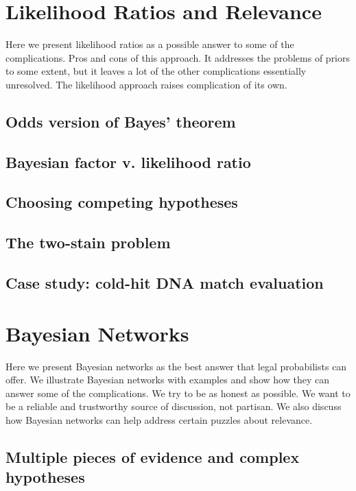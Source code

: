 \documentclass[]{book}
\begin{document}
\chapter{Likelihood Ratios and Relevance}

Here we present likelihood ratios as a possible
answer to some of the complications. Pros and cons
of this approach. It addresses
the problems of priors to some extent,
but it leaves a lot of the other complications essentially unresolved.
The likelihood approach raises
complication of its own.

\section{Odds version of Bayes' theorem}

\section{Bayesian factor v. likelihood ratio}

\section{Choosing competing hypotheses}

\section{The two-stain problem}

\section{Case study: cold-hit DNA match evaluation}

\chapter{Bayesian Networks}

Here we present Bayesian networks
as the best answer that legal probabilists
can offer. We illustrate Bayesian networks
with examples and show how they can answer
some of the complications. We try to be
as honest as possible. We want to be a reliable and trustworthy
source of discussion, not partisan. We also discuss
how Bayesian networks can help address certain
puzzles about relevance.

\section{Multiple pieces of evidence and complex hypotheses}
\end{document}
